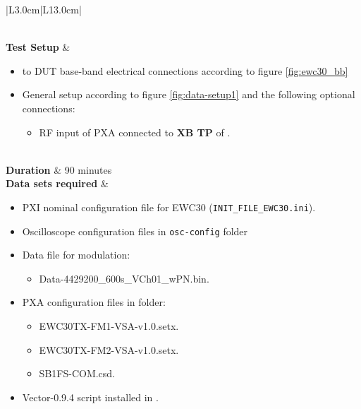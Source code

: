 \begin{table}[H]
\begin{tabular}{|L{3.0cm}|L{13.0cm}|}
\begin{itemize}[nosep,after=\strut]
		\end{itemize}
		
		\\\hline
		\textbf{Test Setup} &
		\begin{minipage}[t]{\linewidth}
		\begin{itemize}[nosep,after=\strut]
		\item \comEgse{}{} to DUT base-band electrical connections according to figure \ref{fig:ewc30_bb}
		\item General setup according to figure \ref{fig:data-setup1} and the following optional connections:
		\begin{itemize}
			\item RF input of PXA connected to \textbf{XB TP} of \fmr{}.
		\end{itemize}
	\end{itemize}
	\end{minipage}
	\\\hline
	\textbf{Duration} & 90 minutes\\\hline
	\textbf{Data sets required} &
	\begin{minipage}[t]{\linewidth}
			\begin{itemize}[nosep,after=\strut]
				\item \comEgse{} PXI nominal configuration file for EWC30 (\texttt{INIT\_FILE\_EWC30.ini}).
				\item Oscilloscope configuration files in \texttt{osc-config} folder
				\item Data file for modulation:
				\begin{itemize}[nosep,after=\strut]
					\item Data-4429200\_600s\_VCh01\_wPN.bin.
				\end{itemize}
				\item PXA configuration files in \texttt{\pxaTestFolderName} folder:
					\begin{itemize}[nosep,after=\strut]
						\item EWC30TX-FM1-VSA-v1.0.setx.
						\item EWC30TX-FM2-VSA-v1.0.setx.
						\item SB1FS-COM.csd.
					\end{itemize}
					\item Vector-0.9.4 script installed in \vmTesting.
		

\end{itemize}
\end{minipage}
\end{tabular}
\end{table}
